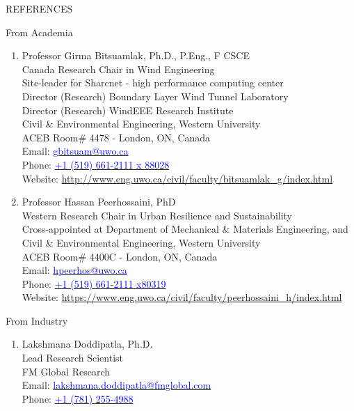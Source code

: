 \documentclass{resume} %
\begin{document}
\begin{rSection}{REFERENCES}
\begin{rSubsection}{From Academia}{}{}{}
\begin{enumerate}


\item {Professor Girma Bitsuamlak, Ph.D., P.Eng., F CSCE \\
Canada Research Chair in Wind Engineering\\
Site-leader for Sharcnet - high performance computing center\\
Director (Research) Boundary Layer Wind Tunnel Laboratory\\
Director (Research) WindEEE Research Institute\\
Civil \& Environmental Engineering, Western University \\
ACEB Room# 4478 - London, ON, Canada \\
Email: \href{gbitsuam@uwo.ca}{\textcolor {blue} {gbitsuam@uwo.ca}}\\
Phone: \href{tel:+1 (519) 661-2111 x 88028}{\textcolor {blue} {+1 (519) 661-2111 x 88028}}\\ 
Website: \url{http://www.eng.uwo.ca/civil/faculty/bitsuamlak_g/index.html}}\\

\item {Professor Hassan Peerhossaini, PhD\\
Western Research Chair in Urban Resilience and Sustainability\\
Cross-appointed at Department of Mechanical \&  Materials Engineering, and \\
Civil \&  Environmental Engineering, Western University \\
ACEB Room# 4400C - London, ON, Canada \\
Email: \href{hpeerhos@uwo.ca}{\textcolor {blue} {hpeerhos@uwo.ca}}\\
Phone: \href{tel:+1 (519) 661-2111 x80319}{\textcolor {blue} {+1 (519) 661-2111 x80319}}\\ 
Website: \url{https://www.eng.uwo.ca/civil/faculty/peerhossaini_h/index.html}}\\
\end{enumerate}
\end{rSubsection}



\begin{rSubsection}{From Industry}{}{}{}
\begin{enumerate}
\item {Lakshmana Doddipatla, Ph.D.\\
Lead Research Scientist\\
FM Global Research\\
Email: \href{lakshmana.doddipatla@fmglobal.com}{\textcolor {blue} {lakshmana.doddipatla@fmglobal.com}}\\
Phone: \href{tel: +1 (781) 255-4988}{\textcolor {blue} {+1 (781) 255-4988}}}\\

\end{enumerate}
\end{rSubsection}
\end{rSection}
\end{document}
